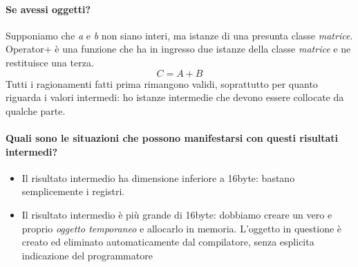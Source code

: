 \paragraph{Se avessi oggetti?} Supponiamo che \emph{a} e \emph{b} non siano interi, ma istanze di una presunta classe \emph{matrice}. Operator+ è una funzione che ha in ingresso due istanze della classe \emph{matrice} e ne restituisce una terza. 
\[C=A+B\]
Tutti i ragionamenti fatti prima rimangono validi, soprattutto per quanto riguarda i valori intermedi: ho istanze intermedie che devono essere collocate da qualche parte. 
\paragraph{Quali sono le situazioni che possono manifestarsi con questi risultati intermedi?}
\begin{itemize}
	\item Il risultato intermedio ha dimensione inferiore a 16byte: bastano semplicemente i registri.
	\item Il risultato intermedio è più grande di 16byte: dobbiamo creare un vero e proprio \emph{oggetto temporaneo} e allocarlo in memoria. L'oggetto in questione è creato ed eliminato automaticamente dal compilatore, senza esplicita indicazione del programmatore
\end{itemize}
